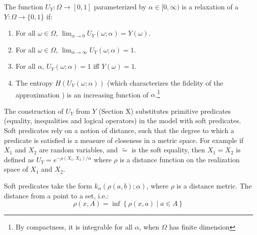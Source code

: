 
\begin{definition}
The function $U_Y : \Omega \to [0, 1]$ parameterized by $\alpha \in [0, \infty)$ is a relaxation of a $Y: \Omega \to \{0, 1\}$ if:
\begin{enumerate}[label=(\roman*)]
	\label{def:temp}
	\item For all $\omega \in \Omega$, $\lim_{\alpha \to 0}U_Y(\omega; \alpha) = Y(\omega)$.
	\item For all $\omega \in \Omega$, $\lim_{\alpha \to \infty}U_Y(\omega; \alpha) = 1$.

    \item For all $\alpha$, $U_Y(\omega; \alpha) = 1$ iff $Y(\omega) = 1$.
    \item The entropy $H(U_Y(\omega; \alpha))$ (which characterizes the fidelity of the approximation ) is an increasing function of $\alpha$.\footnote
    {By compactness, it is integrable for all $\alpha$, when $\Omega$ has finite dimension}
\end{enumerate}
\end{definition}


The construction of $U_Y$ from $Y$ (Section X) substitutes primitive predicates (equality, inequalities and logical operators) in the model with soft predicates.
Soft predicates rely on a notion of distance, such that the degree to which a predicate is satisfied is a measure of closeness in a metric space. 
For example if $X_1$ and $X_2$ are random variables, and $\tilde{=}$ is the soft equality, then $X_1 = X_2$ is defined as $U_Y = e^{-\rho(X_1, X_2) / \alpha}$ where $\rho$ is a distance function on the realization space of $X_1$ and $X_2$.

Soft  predicates take the form $k_\alpha(\rho(a, b); \alpha)$, 
where $\rho$ is a distance metric.
The distance from a point to a set, i.e.:
$$
\rho(x, A) = \inf \left\{\rho(x, a) \mid a \in A\right\}
$$

